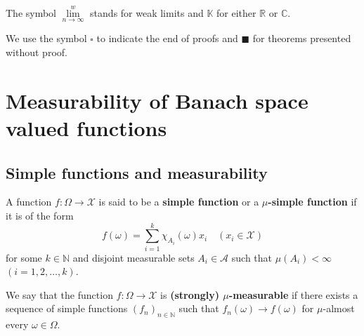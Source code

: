 \documentclass[a4paper, 12pt]{article}
\begin{document}
The symbol $\lim\limits^{w}_{n \to \infty}$ stands for weak limits and $\mathbb{K}$ for either $\mathbb{R}$ or $\mathbb{C}$. 

We use the symbol $\square$ to indicate the end of proofs and $\blacksquare$ for theorems presented without proof.
\newpage
\section{Measurability of Banach space valued functions} \label{sec:measurability}
\subsection{Simple functions and measurability}
A function $f \colon \Omega \rightarrow \mathcal{X}$ is said to be a \textbf{simple function} or a \textbf{$\mu$-simple function} if it is of the form 
$$
f(\omega) = \sum^{k}_{i=1}\chi_{A_i}(\omega) x_i \quad (x_i \in \mathcal{X})
$$ 
for some $k \in \mathbb{N}$ and disjoint measurable sets $A_i  \in \mathcal{A}$ such that $\mu(A_i) < \infty$ $(i = 1, 2, \ldots, k)$.

We say that the function $f \colon \Omega \rightarrow \mathcal{X}$ is \textbf{(strongly) $\mu$-measurable} if there exists a sequence of simple functions $(f_n)_{n \in \mathbb{N}}$ such that $f_n(\omega) \rightarrow f(\omega)$ for $\mu$-almost every $\omega \in \Omega$. 
\end{document}
